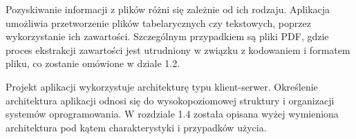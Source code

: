 \documentclass[12pt,a4paper,twoside]{article}
\begin{document}
Pozyskiwanie informacji z plików różni się zależnie od ich rodzaju. Aplikacja umożliwia przetworzenie plików tabelarycznych czy tekstowych, poprzez wykorzystanie ich zawartości. Szczególnym przypadkiem są pliki PDF, gdzie proces ekstrakcji zawartości jest utrudniony w związku z kodowaniem i formatem pliku, co zostanie omówione w dziale 1.2. \par
Projekt aplikacji wykorzystuje architekturę typu klient-serwer. Określenie architektura aplikacji odnosi się do wysokopoziomowej struktury i organizacji systemów oprogramowania. W rozdziale 1.4 została opisana wyżej wymieniona architektura pod kątem charakterystyki i przypadków użycia. 
\end{document}
